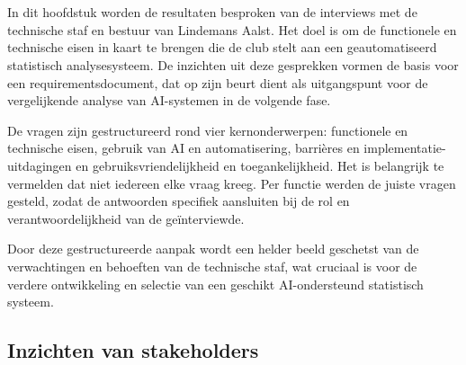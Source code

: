 \chapter{}%
\label{ch:requirementsanalyse}

In dit hoofdstuk worden de resultaten besproken van de interviews met de technische staf en bestuur van Lindemans Aalst. Het doel is om de functionele en technische eisen in kaart te brengen die de club stelt aan een geautomatiseerd statistisch analysesysteem. De inzichten uit deze gesprekken vormen de basis voor een requirementsdocument, dat op zijn beurt dient als uitgangspunt voor de vergelijkende analyse van AI-systemen in de volgende fase.

De vragen zijn gestructureerd rond vier kernonderwerpen: functionele en technische eisen, gebruik van AI en automatisering, barrières en implementatie-uitdagingen en gebruiksvriendelijkheid en toegankelijkheid. Het is belangrijk te vermelden dat niet iedereen elke vraag kreeg. Per functie werden de juiste vragen gesteld, zodat de antwoorden specifiek aansluiten bij de rol en verantwoordelijkheid van de geïnterviewde.

Door deze gestructureerde aanpak wordt een helder beeld geschetst van de verwachtingen en behoeften van de technische staf, wat cruciaal is voor de verdere ontwikkeling en selectie van een geschikt AI-ondersteund statistisch systeem.

\section{Inzichten van stakeholders}

